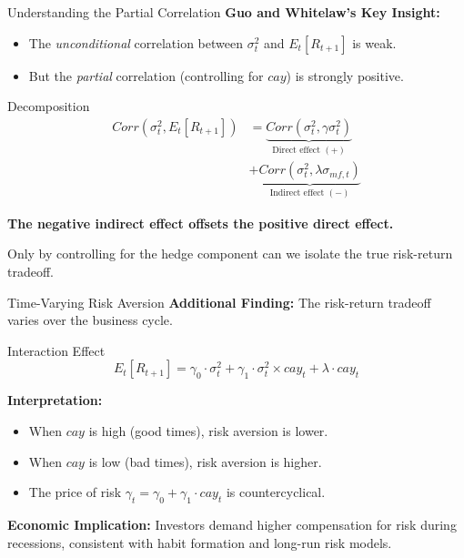 \documentclass{beamer}
\begin{document}
\begin{frame}{Understanding the Partial Correlation}
    \textbf{Guo and Whitelaw's Key Insight:}
    
    \begin{itemize}
        \item The \textit{unconditional} correlation between $\sigma_t^2$ and $E_t[R_{t+1}]$ is weak.
        \item But the \textit{partial} correlation (controlling for $cay$) is strongly positive.
    \end{itemize}
    
    \begin{block}{Decomposition}
        \begin{align}
            Corr(\sigma_t^2, E_t[R_{t+1}]) &= \underbrace{Corr(\sigma_t^2, \gamma\sigma_t^2)}_{\text{Direct effect } (+)} \nonumber \\
            &+ \underbrace{Corr(\sigma_t^2, \lambda\sigma_{mf,t})}_{\text{Indirect effect } (-)}
        \end{align}
    \end{block}
    
    \textbf{The negative indirect effect offsets the positive direct effect.}
    
    \vspace{0.2cm}
    Only by controlling for the hedge component can we isolate the true risk-return tradeoff.
\end{frame}

\begin{frame}{Time-Varying Risk Aversion}
    \textbf{Additional Finding:} The risk-return tradeoff varies over the business cycle.
    
    \begin{block}{Interaction Effect}
        \begin{equation}
            E_t[R_{t+1}] = \gamma_0 \cdot \sigma_t^2 + \gamma_1 \cdot \sigma_t^2 \times cay_t + \lambda \cdot cay_t
        \end{equation}
    \end{block}
    
    \textbf{Interpretation:}
    \begin{itemize}
        \item When $cay$ is high (good times), risk aversion is lower.
        \item When $cay$ is low (bad times), risk aversion is higher.
        \item The price of risk $\gamma_t = \gamma_0 + \gamma_1 \cdot cay_t$ is countercyclical.
    \end{itemize}
    
    \vspace{0.3cm}
    \textbf{Economic Implication:} Investors demand higher compensation for risk during recessions, consistent with habit formation and long-run risk models.
\end{frame}
\end{document}
